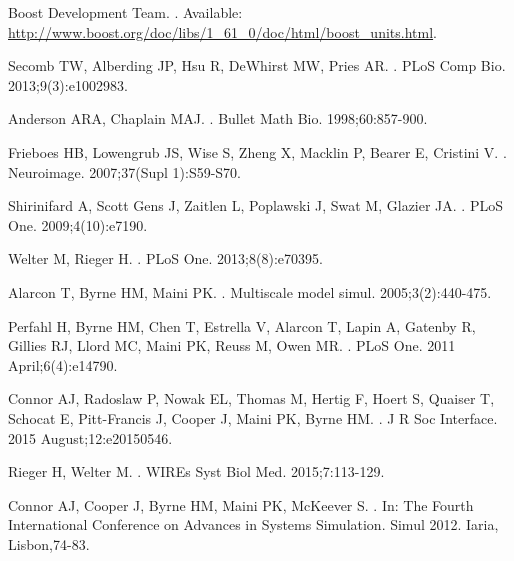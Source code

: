\documentclass[10pt,letterpaper]{article}
\begin{document}
\begin{thebibliography}{10}
Boost Development Team.
.
\newblock Available: \url{http://www.boost.org/doc/libs/1_61_0/doc/html/boost_units.html}.

Secomb TW, Alberding JP, Hsu R, DeWhirst MW, Pries AR.
.
\newblock PLoS Comp Bio. 2013;9(3):e1002983.

Anderson ARA, Chaplain MAJ.
.
\newblock Bullet Math Bio. 1998;60:857-900.

Frieboes HB, Lowengrub JS, Wise S, Zheng X, Macklin P, Bearer E, Cristini V.
.
\newblock Neuroimage. 2007;37(Supl 1):S59-S70.

Shirinifard A, Scott Gens J, Zaitlen L, Poplawski J, Swat M, Glazier JA.
.
\newblock PLoS One. 2009;4(10):e7190.

Welter M, Rieger H.
.
\newblock PLoS One. 2013;8(8):e70395.

Alarcon T, Byrne HM, Maini PK.
.
\newblock Multiscale model simul. 2005;3(2):440-475.

Perfahl H, Byrne HM, Chen T, Estrella V, Alarcon T, Lapin A, Gatenby R, Gillies RJ, Llord MC, Maini PK, Reuss M, Owen MR.
.
\newblock PLoS One. 2011 April;6(4):e14790.

Connor AJ, Radoslaw P, Nowak EL, Thomas M, Hertig F, Hoert S, Quaiser T, Schocat E, Pitt-Francis J, Cooper J, Maini PK, Byrne HM.
.
\newblock J R Soc Interface. 2015 August;12:e20150546.

Rieger H, Welter M.
.
\newblock WIREs Syst Biol Med. 2015;7:113-129.

Connor AJ, Cooper J, Byrne HM, Maini PK, McKeever S.
.
\newblock In: The Fourth International Conference on Advances in Systems Simulation. Simul 2012. Iaria, Lisbon,74-83.


\end{thebibliography}
\end{document}
